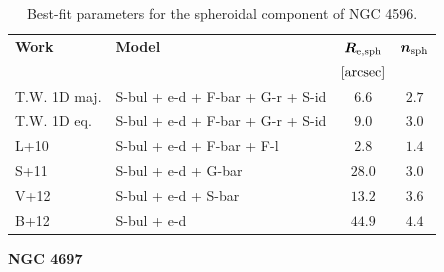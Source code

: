 \documentclass[preprint2]{emulateapj}
\begin{document}
  \begin{table}[h]
  \small
  \caption{Best-fit parameters for the spheroidal component of NGC 4596.}
  \begin{center}
  \begin{tabular}{llcc}
  \hline
  {\bf Work} & {\bf Model}   & $\bm R_{\rm e,sph}$    & $\bm n_{\rm sph}$ \\
    &  &  $[\rm arcsec]$ & \\
  \hline
  T.W. 1D maj. & S-bul + e-d + F-bar + G-r + S-id & $6.6$  &  $2.7$ \\
  T.W. 1D eq.  & S-bul + e-d + F-bar + G-r + S-id & $9.0$  &  $3.0$ \\
  \hline
  L+10      & S-bul + e-d + F-bar + F-l & $2.8$  &  $1.4$ \\
  S+11      & S-bul + e-d + G-bar & $28.0$  &  $3.0$ \\
  V+12      & S-bul + e-d + S-bar & $13.2$  &  $3.6$ \\
  B+12      & S-bul + e-d & $44.9$  &  $4.4$ \\
  \hline
  \end{tabular}
  \end{center}
  \label{tab:n4596}
  \end{table}



  \clearpage\newpage\noindent
  {\bf NGC 4697 \\}
\end{document}
